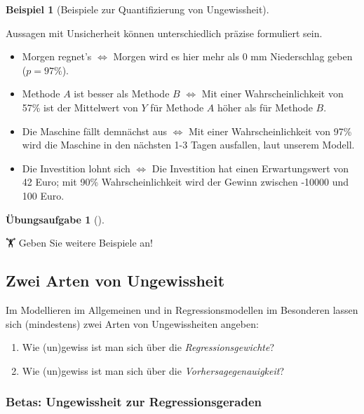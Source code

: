 \documentclass[
  ngerman,
  letterpaper,
  twoside,
  open=any]{scrbook}
\theoremstyle{definition}
\newtheorem{example}{Beispiel}[chapter]
\theoremstyle{plain}
\theoremstyle{definition}
\newtheorem{exercise}{Übungsaufgabe}[chapter]
\theoremstyle{definition}
\theoremstyle{remark}
\begin{document}
\begin{example}[Beispiele zur Quantifizierung von
Ungewissheit]\protect\hypertarget{exm-muenz}{}\label{exm-muenz}

Aussagen mit Unsicherheit können unterschiedlich präzise formuliert
sein.

\begin{itemize}
\item
  Morgen regnet's \(\Leftrightarrow\) Morgen wird es hier mehr als 0 mm
  Niederschlag geben (\(p=97\%\)).
\item
  Methode \(A\) ist besser als Methode \(B\) \(\Leftrightarrow\) Mit
  einer Wahrscheinlichkeit von 57\% ist der Mittelwert von \(Y\) für
  Methode \(A\) höher als für Methode \(B\).
\item
  Die Maschine fällt demnächst aus \(\Leftrightarrow\) Mit einer
  Wahrscheinlichkeit von 97\% wird die Maschine in den nächsten 1-3
  Tagen ausfallen, laut unserem Modell.
\item
  Die Investition lohnt sich \(\Leftrightarrow\) Die Investition hat
  einen Erwartungswert von 42 Euro; mit 90\% Wahrscheinlichkeit wird der
  Gewinn zwischen -10000 und 100 Euro.
\end{itemize}

\end{example}

\begin{exercise}[]\protect\hypertarget{exr-ungewiss}{}\label{exr-ungewiss}

🏋 Geben Sie weitere Beispiele an!

\end{exercise}

\subsection{Zwei Arten von
Ungewissheit}\label{zwei-arten-von-ungewissheit}

Im Modellieren im Allgemeinen und in Regressionsmodellen im Besonderen
lassen sich (mindestens) zwei Arten von Ungewissheiten angeben:

\begin{enumerate}
\def\labelenumi{\arabic{enumi}.}
\item
  Wie (un)gewiss ist man sich über die \emph{Regressionsgewichte}?
\item
  Wie (un)gewiss ist man sich über die \emph{Vorhersagegenauigkeit}?
\end{enumerate}

\subsubsection{Betas: Ungewissheit zur
Regressionsgeraden}\label{betas-ungewissheit-zur-regressionsgeraden}
\end{document}
